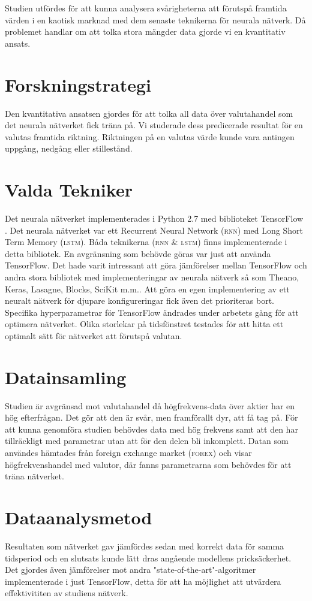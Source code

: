 Studien utfördes för att kunna analysera svårigheterna att förutspå framtida
värden i en kaotisk marknad med dem senaste teknikerna för neurala nätverk. Då
problemet handlar om att tolka stora mängder data gjorde vi en kvantitativ
ansats.

\section{Forskningstrategi}
Den kvantitativa ansatsen gjordes för att tolka all data över valutahandel som
det neurala nätverket fick träna på. Vi studerade dess predicerade resultat för
en valutas framtida riktning. Riktningen på en valutas värde kunde vara antingen
uppgång, nedgång eller stillestånd.

\section{Valda Tekniker}
Det neurala nätverket implementerades i Python 2.7 med biblioteket TensorFlow
\citep{tensorflow2015-whitepaper}. Det neurala nätverket var ett Recurrent
Neural Network \textsc{(rnn)} med Long Short Term Memory \textsc{(lstm)}. Båda
teknikerna \textsc{(rnn \& lstm)} finns implementerade i detta bibliotek. En avgränsning
som behövde göras var just att använda TensorFlow. Det hade varit intressant att
göra jämförelser mellan TensorFlow och andra stora bibliotek med
implementeringar av neurala nätverk så som Theano, Keras, Lasagne, Blocks,
SciKit m.m.. Att göra en egen implementering av ett neuralt nätverk för djupare
konfigureringar fick även det prioriteras bort. Specifika hyperparametrar för
TensorFlow ändrades under arbetets gång för att optimera nätverket. Olika
storlekar på tidsfönstret testades för att hitta ett optimalt sätt för nätverket
att förutspå valutan.


\section{Datainsamling}
Studien är avgränsad mot valutahandel då högfrekvens-data över aktier har en hög
efterfrågan. Det gör att den är svår, men framförallt dyr, att få tag på. För
att kunna genomföra studien behövdes data med hög frekvens samt att den har
tillräckligt med parametrar utan att för den delen bli inkomplett. Datan som
användes hämtades från foreign exchange market \textsc{(forex)} och visar
högfrekvenshandel med valutor, där fanns parametrarna som behövdes för att träna
nätverket.

\section{Dataanalysmetod}
Resultaten som nätverket gav jämfördes sedan med korrekt data för samma
tidsperiod och en slutsats kunde lätt dras angående modellens
pricksäckerhet. Det gjordes även jämförelser mot andra
"state-of-the-art"-algoritmer implementerade i just TensorFlow, detta för att ha
möjlighet att utvärdera effektivititen av studiens nätverk.
